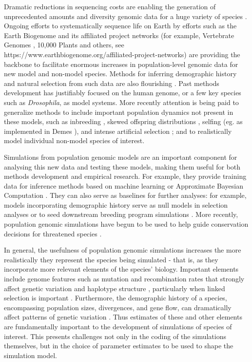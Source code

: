 \documentclass[hidelinks]{article}
\begin{document}
Dramatic reductions in sequencing costs are enabling the generation of
unprecedented amounts and diversity genomic data for a huge variety of species
\citep{Ellegren2014}. Ongoing efforts to systematically sequence life on
Earth by efforts such as the Earth Biogenome \citep{Lewin2022} and its
affiliated project networks (for example, Vertebrate Genomes
\citep{Rhie2021}, 10,000 Plants \citep{Cheng2018} and others, see
https://www.earthbiogenome.org/affiliated-project-networks) are
providing the backbone to facilitate enormous increases in population-level genomic data for
new model and non-model species. Methods for inferring
demographic history and natural selection from such data are also flourishing
\citep{Beichman2018}. Past methods development has justifiably focused on the
human genome, or a few key species such as \emph{Drosophila}, 
as model systems. More recently attention is being paid to
generalize methods to include important population dynamics not present
in these models, such as inbreeding \citep{Blischak2020}, skewed offspring
distributions \citep{Montano2016}, selfing (eg. as implemented in Demes
\citep{Gower2022}), and intense artificial selection \citep{MacLeod2013,
MacLeod2014}; and to realistically model individual non-model species of interest.

Simulations from population genomic models are an important component
for analysing this new data and testing these models, making them useful for both methods
development and empirical research. For example, they provide training
data for inference methods based on machine learning \citep{Schrider2018} or
Approximate Bayesian Computation \citep{Csillery2010}. They can also serve as
baselines for further analyses: for example, models incorporating
demographic history serve as null models in selection analyses
\citep{Hsieh2016a} or to seed downstream breeding program simulations
\citep{Gaynor2020}. More recently, population genomic simulations have begun
to be used to help guide conservation decisions for threatened species
\citep{Teixeira2021}.

In general, the usefulness of population genomic simulations increases
the more realistically they represent the species being simulated - that
is, as they incorporate more relevant elements of the species' biology. Important
elements include genome features such as mutation and recombination
rates that strongly affect genetic variation and haplotype structure
\citep{Nachman2002}, particularly when linked selection is important \citep{Cutter2013}. 
Furthermore, the demographic history of a
species, encompassing population sizes, divergences, and gene flow, can
dramatically affect patterns of genetic variation \citep{Teshima2006}. Thus
estimates of these and other elements are fundamentally important to the
development of simulations of species of interest. This presents
challenges not only in the coding of the simulations themselves, but in
the choice of parameter estimates to be used to shape the simulation
model.
\end{document}
